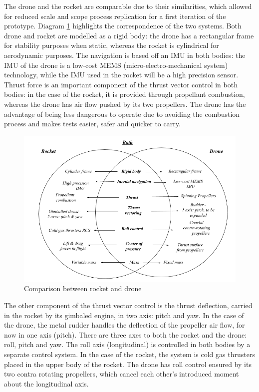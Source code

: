 The drone and the rocket are comparable due to their similarities, which allowed for reduced scale and scope process replication for a first iteration of the prototype. Diagram \ref{diagramcomparison} highlights the correspondence of the two systems. Both drone and rocket are modelled as a rigid body: the drone has a rectangular frame for stability purposes when static, whereas the rocket is cylindrical for aerodynamic purposes. The navigation is based off an IMU in both bodies: the IMU of the drone is a low-cost MEMS (micro-electro-mechanical system) technology, while the IMU used in the rocket will be a high precision sensor. 
Thrust force is an important component of the thrust vector control in both bodies: in the case of the rocket, it is provided through propellant combustion, whereas the drone has air flow pushed by its two propellers. 
The drone has the advantage of being less dangerous to operate due to avoiding the combustion process and makes tests easier, safer and quicker to carry. 

\begin{figure}[H]
  \includegraphics[scale=0.9]{graphics/Diagram.png}
  \caption{Comparison between rocket and drone}
  \label{diagramcomparison}
\end{figure}

The other component of the thrust vector control is the thrust deflection, carried in the rocket by its gimbaled engine, in two axis: pitch and yaw. 
In the case of the drone, the metal rudder handles the deflection of the propeller air flow, for now in one axis (pitch). There are three axes to both the rocket and the drone: roll, pitch and yaw. The roll axis (longitudinal) is controlled in both bodies by a separate control system. In the case of the rocket, the system is cold gas thrusters placed in the upper body of the rocket. 
The drone has roll control ensured by its two contra rotating propellers, which cancel each other’s introduced moment about the longitudinal axis. 

